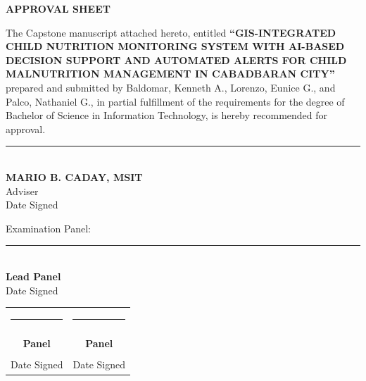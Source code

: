 \documentclass[12pt, a4paper]{report}
\begin{document}
\clearpage
\thispagestyle{plain}
\begin{singlespace}
\begin{center}
    \Large \textbf{APPROVAL SHEET}
\end{center}
\vspace{0.2cm}

The Capstone manuscript attached hereto, entitled \textbf{``GIS-INTEGRATED CHILD NUTRITION MONITORING SYSTEM WITH AI-BASED DECISION SUPPORT AND AUTOMATED ALERTS FOR CHILD MALNUTRITION MANAGEMENT IN CABADBARAN CITY''} prepared and submitted by Baldomar, Kenneth A., Lorenzo, Eunice G., and Palco, Nathaniel G., in partial fulfillment of the requirements for the degree of Bachelor of Science in Information Technology, is hereby recommended for approval.

\vspace{0.4cm}

\begin{center}
    \rule{7cm}{0.5pt} \\
    \vspace{0.1cm} 
    \textbf{MARIO B. CADAY, MSIT} \\
    \vspace{0.2cm} 
    Adviser \\
    \vspace{0.1cm} 
    Date Signed
\end{center}

\vspace{0.2cm}
\noindent
\begin{flushleft}
    Examination Panel:
\end{flushleft}
\vspace{0.4cm}

\begin{center}
    \rule{7cm}{0.5pt} \\
    \vspace{0.1cm}
    \textbf{Lead Panel} \\
    \vspace{0.2cm}
    Date Signed
\end{center}

\vspace{0.4cm}
\noindent
\begin{center}
    \begin{tabular}{c c}
        \rule{6.5cm}{0.5pt} & \rule{6.5cm}{0.5pt} \\
        \vspace{0.1cm} & \vspace{0.1cm} \\
        \textbf{Panel} & \textbf{Panel} \\
        \vspace{0.2cm} & \vspace{0.2cm} \\
        Date Signed & Date Signed
    \end{tabular}
\end{center}


\end{singlespace}
\end{document}
